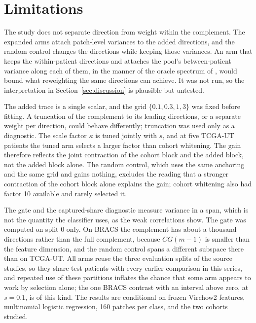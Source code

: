 \section{Limitations}
\label{sec:limitations}
The study does not separate direction from weight within the complement. The expanded arms attach patch-level variances to the added directions, and the random control changes the directions while keeping those variances. An arm that keeps the within-patient directions and attaches the pool's between-patient variance along each of them, in the manner of the oracle spectrum of \citet{queisler2026spectrumRegularization}, would bound what reweighting the same directions can achieve. It was not run, so the interpretation in Section~\ref{sec:discussion} is plausible but untested.

The added trace is a single scalar, and the grid $\{0.1,0.3,1,3\}$ was fixed before fitting. A truncation of the complement to its leading directions, or a separate weight per direction, could behave differently; truncation was used only as a diagnostic. The scale factor $\kappa$ is tuned jointly with $s$, and at five TCGA-UT patients the tuned arm selects a larger factor than cohort whitening. The gain therefore reflects the joint contraction of the cohort block and the added block, not the added block alone. The random control, which uses the same anchoring and the same grid and gains nothing, excludes the reading that a stronger contraction of the cohort block alone explains the gain; cohort whitening also had factor 10 available and rarely selected it.

The gate and the captured-share diagnostic measure variance in a span, which is not the quantity the classifier uses, as the weak correlations show. The gate was computed on split 0 only. On BRACS the complement has about a thousand directions rather than the full complement, because $CG(m-1)$ is smaller than the feature dimension, and the random control spans a different subspace there than on TCGA-UT. All arms reuse the three evaluation splits of the source studies, so they share test patients with every earlier comparison in this series, and repeated use of these partitions inflates the chance that some arm appears to work by selection alone; the one BRACS contrast with an interval above zero, at $s=0.1$, is of this kind. The results are conditional on frozen Virchow2 features, multinomial logistic regression, 160 patches per class, and the two cohorts studied.
